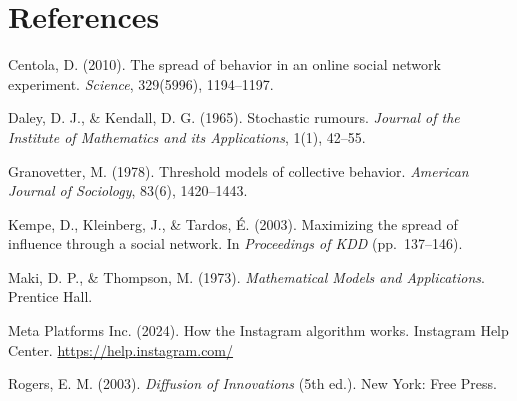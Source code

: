 \documentclass[11pt]{article}
\begin{document}
\section{References}

Centola, D. (2010). The spread of behavior in an online social network experiment. \textit{Science}, 329(5996), 1194--1197.

Daley, D. J., \& Kendall, D. G. (1965). Stochastic rumours. \textit{Journal of the Institute of Mathematics and its Applications}, 1(1), 42--55.

Granovetter, M. (1978). Threshold models of collective behavior. \textit{American Journal of Sociology}, 83(6), 1420--1443.

Kempe, D., Kleinberg, J., \& Tardos, \'{E}. (2003). Maximizing the spread of influence through a social network. In \textit{Proceedings of KDD} (pp.~137--146).

Maki, D. P., \& Thompson, M. (1973). \textit{Mathematical Models and Applications}. Prentice Hall.

Meta Platforms Inc. (2024). How the Instagram algorithm works. Instagram Help Center. \url{https://help.instagram.com/}

Rogers, E. M. (2003). \textit{Diffusion of Innovations} (5th ed.). New York: Free Press.
\end{document}

